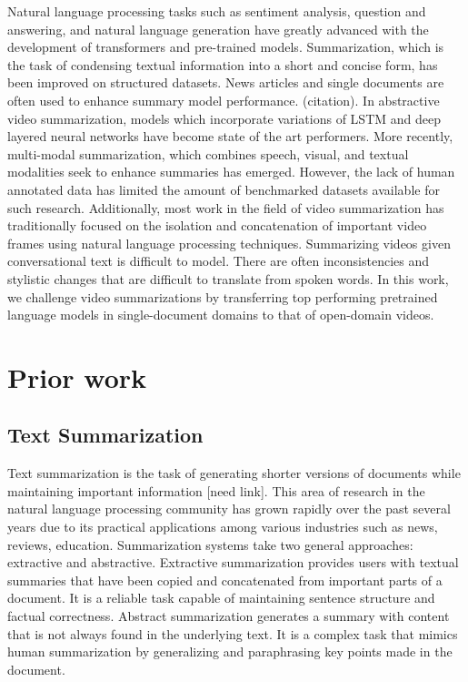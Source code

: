 \documentclass{article}
\begin{document}
Natural language processing tasks such as sentiment analysis, question and answering, and natural language generation have greatly advanced with the development of transformers and pre-trained models. Summarization, which is the task of condensing textual information into a short and concise form, has been improved on structured datasets. News articles and single documents are often used to enhance summary model performance. (citation). In abstractive video summarization, models which incorporate variations of LSTM and deep layered neural networks have become state of the art performers. More recently, multi-modal summarization, which combines speech, visual, and textual modalities seek to enhance summaries has emerged. However, the lack of human annotated data has limited the amount of benchmarked datasets available for such research. Additionally, most work in the field of video summarization has traditionally focused on the isolation and concatenation of important video frames using natural language processing techniques. Summarizing videos given conversational text is difficult to model. There are often inconsistencies and stylistic changes that are difficult to translate from spoken words. In this work, we challenge video summarizations by transferring top performing pretrained language models in single-document domains to that of open-domain videos.  

\section{Prior work}

\subsection{Text Summarization}

Text summarization is the task of generating shorter versions of documents while maintaining important information [need link]. This area of research in the natural language processing community has grown rapidly over the past several years due to its practical applications among various industries such as news, reviews, education. Summarization systems take two general approaches: extractive and abstractive. Extractive summarization provides users with textual summaries that have been copied and concatenated from important parts of a document. It is a reliable task capable of maintaining sentence structure and factual correctness. Abstract summarization generates a summary with content that is not always found in the underlying text. It is a complex task that mimics human summarization by generalizing and paraphrasing key points made in the document. 
\end{document}
